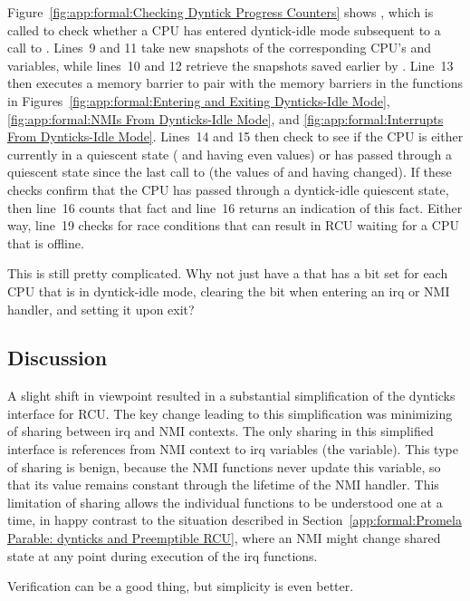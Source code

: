 Figure~\ref{fig:app:formal:Checking Dyntick Progress Counters}
shows , which is called to check
whether a CPU has entered dyntick-idle mode subsequent to a call
to .
Lines~9 and 11 take new snapshots of the corresponding CPU's
 and  variables, while lines~10 and 12
retrieve the snapshots saved earlier by
.
Line~13 then
executes a memory barrier to pair with the memory barriers in
the functions in
Figures~\ref{fig:app:formal:Entering and Exiting Dynticks-Idle Mode},
\ref{fig:app:formal:NMIs From Dynticks-Idle Mode}, and
\ref{fig:app:formal:Interrupts From Dynticks-Idle Mode}.
Lines~14 and 15 then check to see if the CPU is either currently in
a quiescent state ( and  having even values) or
has passed through a quiescent state since the last call to
 (the values of
 and  having changed).
If these checks confirm that the CPU has passed through a dyntick-idle
quiescent state, then line~16 counts that fact and line~16 returns
an indication of this fact.
Either way, line~19 checks for race conditions that can result in RCU
waiting for a CPU that is offline.

\QuickQuiz{}
	This is still pretty complicated.
	Why not just have a  that has a bit set for
	each CPU that is in dyntick-idle mode, clearing the bit
	when entering an irq or NMI handler, and setting it upon
	exit?
 \QuickQuizEnd

\subsection{Discussion}
\label{app:formal:Discussion}

A slight shift in viewpoint resulted in a substantial simplification
of the dynticks interface for RCU.
The key change leading to this simplification was minimizing of
sharing between irq and NMI contexts.
The only sharing in this simplified interface is references from NMI
context to irq variables (the  variable).
This type of sharing is benign, because the NMI functions never update
this variable, so that its value remains constant through the lifetime
of the NMI handler.
This limitation of sharing allows the individual functions to be
understood one at a time, in happy contrast to the situation
described in
Section~\ref{app:formal:Promela Parable: dynticks and Preemptible RCU},
where an NMI might change shared state at any point during execution of
the irq functions.

Verification can be a good thing, but simplicity is even better.
